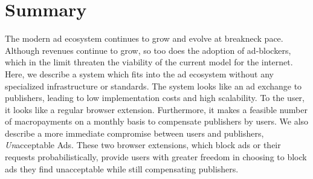 \section{Summary}
The modern ad ecosystem continues to grow and evolve at breakneck pace.
Although revenues continue to grow, so too does the adoption of ad-blockers, which in the limit threaten the viability of the current model for the internet.
Here, we describe a system which fits into the ad ecosystem without any specialized infrastructure or standards.
The system looks like an ad exchange to publishers, leading to low implementation costs and high scalability.
To the user, it looks like a regular browser extension.
Furthermore, it makes a feasible number of macropayments on a monthly basis to compensate publishers by users.
We also describe a more immediate compromise between users and publishers, \textit{Un}acceptable Ads.
These two browser extensions, which block ads or their requests probabilistically, provide users with greater freedom in choosing to block ads they find unacceptable while still compensating publishers.

